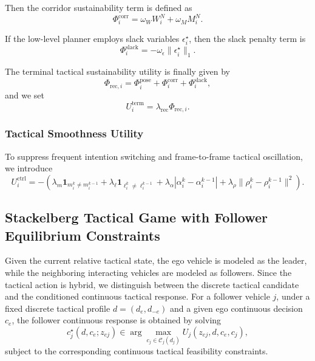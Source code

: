 \documentclass[final ,3p, times]{elsarticle}
\begin{document}
Then the corridor sustainability term is defined as
\begin{equation}
\Phi_i^{\mathrm{corr}}
=
\omega_W W_i^N + \omega_M M_i^N.
\label{eq:terminal_corridor_term}
\end{equation}

If the low-level planner employs slack variables $\epsilon_i^\star$, then the slack penalty term is
\begin{equation}
\Phi_i^{\mathrm{slack}}
=
-\omega_\epsilon \|\epsilon_i^\star\|_1.
\label{eq:terminal_slack_term}
\end{equation}

The terminal tactical sustainability utility is finally given by
\begin{equation}
\Phi_{\mathrm{rec},i}
=
\Phi_i^{\mathrm{pose}}
+
\Phi_i^{\mathrm{corr}}
+
\Phi_i^{\mathrm{slack}},
\label{eq:recursive_plannability}
\end{equation}
and we set
\begin{equation}
U_i^{\mathrm{term}} = \lambda_{\mathrm{rec}} \Phi_{\mathrm{rec},i}.
\label{eq:terminal_utility}
\end{equation}

\subsubsection{Tactical Smoothness Utility}

To suppress frequent intention switching and frame-to-frame tactical oscillation, we introduce
\begin{equation}
U_i^{\mathrm{ctrl}}
=
-
\left(
\lambda_m \mathbf{1}_{m_i^k \neq m_i^{k-1}}
+
\lambda_\ell \mathbf{1}_{\ell_i^k \neq \ell_i^{k-1}}
+
\lambda_\alpha |\alpha_i^k-\alpha_i^{k-1}|
+
\lambda_\rho \|\rho_i^k-\rho_i^{k-1}\|^2
\right).
\label{eq:tactical_smoothness}
\end{equation}


\subsection{Stackelberg Tactical Game with Follower Equilibrium Constraints}
\label{subsec:stackelberg_game}

Given the current relative tactical state, the ego vehicle is modeled as the leader, while the neighboring interacting vehicles are modeled as followers. Since the tactical action is hybrid, we distinguish between the discrete tactical candidate and the conditioned continuous tactical response. For a follower vehicle $j$, under a fixed discrete tactical profile $d=(d_e,d_{-e})$ and a given ego continuous decision $c_e$, the follower continuous response is obtained by solving
\begin{equation}
c_j^\star(d,c_e;z_{ej})
\in
\arg\max_{c_j \in \mathcal{C}_j(d_j)}
U_j(z_{ej},d,c_e,c_j),
\label{eq:follower_response}
\end{equation}
subject to the corresponding continuous tactical feasibility constraints.
\end{document}
